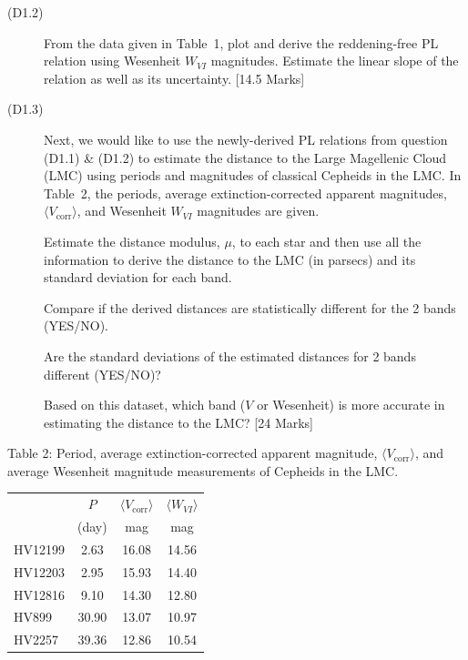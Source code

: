 \begin{description}
\item[(D1.2)] From the data given in Table~1, plot and derive the
  reddening-free PL relation using Wesenheit $W_{VI}$ magnitudes. Estimate the
  linear slope of the relation as well as its uncertainty.
  \hfill[14.5 Marks]
\item[(D1.3)] Next, we would like to use the newly-derived PL relations from
  question (D1.1) \& (D1.2) to estimate the distance to the Large Magellenic
  Cloud (LMC) using periods and magnitudes of classical Cepheids in the LMC.
  In Table~2, the periods, average extinction-corrected apparent magnitudes,
  $\langle V_{\mathrm{corr}}\rangle$, and Wesenheit $W_{VI}$ magnitudes are
  given.

  Estimate the distance modulus, $\mu$, to each star and then use all the
  information to derive the distance to the LMC (in parsecs) and its standard
  deviation for each band.

  Compare if the derived distances are statistically different for the 2 bands
  (YES/NO).

  Are the standard deviations of the estimated distances for 2 bands different
  (YES/NO)?

  Based on this dataset, which band ($V$ or Wesenheit) is more accurate in
  estimating the distance to the LMC? \hfill[24 Marks]
\end{description}

Table 2: Period, average extinction-corrected apparent magnitude,
$\langle V_{\mathrm{corr}}\rangle$, and average Wesenheit magnitude
measurements of Cepheids in the LMC.

\begin{center}
\begin{tabular}{l|c|c|c}
 & $P$ & $\langle V_{\mathrm{corr}}\rangle$ & $\langle W_{VI}\rangle$ \\
 & (day) & mag & mag \\
\hline
HV12199 & 2.63  & 16.08 & 14.56 \\
HV12203 & 2.95  & 15.93 & 14.40 \\
HV12816 & 9.10  & 14.30 & 12.80 \\
HV899   & 30.90 & 13.07 & 10.97 \\
HV2257  & 39.36 & 12.86 & 10.54 \\
\end{tabular}
\end{center}
